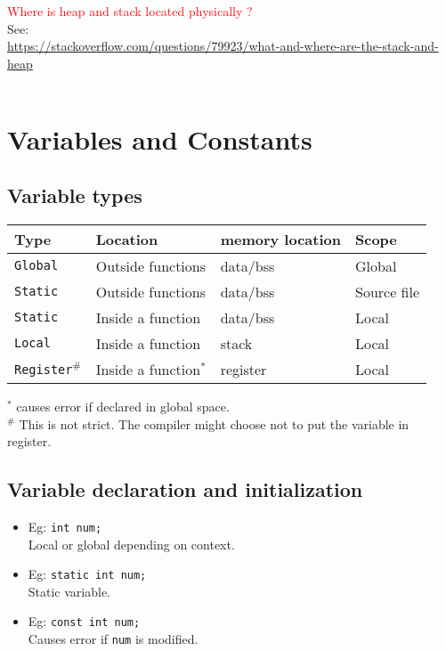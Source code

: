 \begin{multicols*}{3}
\textcolor{red}{Where is heap and stack located physically ?}\\
See:\\
\url{https://stackoverflow.com/questions/79923/what-and-where-are-the-stack-and-heap}

\begin{tabularx}{\linewidth}{l|X}
	
\end{tabularx}


\vfill \null
\columnbreak



\section{Variables and Constants}

\subsection{Variable types}
\begin{tabularx}{\linewidth}{lllX}
Type & Location & memory location & Scope\\
\hline
\texttt{Global} & Outside functions & data/bss & Global\\
\texttt{Static} & Outside functions & data/bss & Source file\\
\texttt{Static} & Inside a function & data/bss & Local\\
\texttt{Local} & Inside a function & stack & Local\\
\texttt{Register$^\#$} & Inside a function$^*$ & register & Local\\
\hline
\end{tabularx}
$^*$ causes error if declared in global space.\\
$^\#$ This is not strict. The compiler might choose not to put the variable in register.

\subsection{Variable declaration and initialization}
\begin{itemize}
\item Eg: \texttt{int num;}\\
Local or global depending on context.
\item Eg: \texttt{static int num;}\\
Static variable.
\item Eg: \texttt{const int num;}\\
Causes error if \texttt{num} is modified.
\end{itemize}

\end{multicols*}
